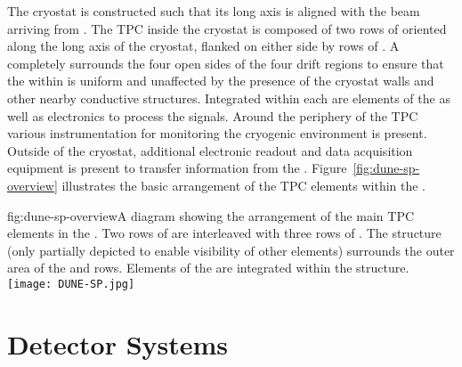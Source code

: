 The cryostat is constructed such that its long axis is aligned with the beam arriving from \fnal.  The TPC  inside the cryostat is composed of two rows of  oriented along the long axis of the cryostat, flanked on either side by rows of .  A  completely surrounds the four
open sides of the four drift regions to ensure that the \efield within is uniform and unaffected by the presence of the cryostat walls and other nearby conductive structures.  Integrated within each  are elements of the  as well as electronics to process the  signals.  Around the periphery of the TPC various instrumentation for monitoring the cryogenic environment is present.  Outside of the cryostat, additional electronic readout and data acquisition equipment is present to transfer information from the .  Figure~\ref{fig:dune-sp-overview} illustrates the basic arrangement of the TPC elements within the .

\begin{dunefigure}{fig:dune-sp-overview}{A diagram showing the arrangement of the main TPC elements in the .  Two rows of  are interleaved with three rows of .  The  structure (only partially depicted to enable visibility of other elements) surrounds the outer area of the  and  rows.  Elements of the  are integrated within the  structure.}
\texttt{[image: DUNE-SP.jpg]}
\end{dunefigure}



\section{Detector Systems}
\label{sec:fdsp-ov-sys}


 
